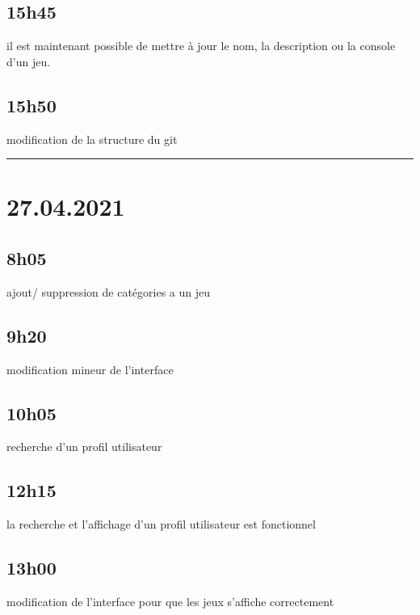 \documentclass[a4paper,12pt,french]{sphinxmanual}
\begin{document}
\subsection{15h45}
\label{\detokenize{logbook:h45}}
\sphinxAtStartPar
il est maintenant possible de mettre à jour le nom, la description ou la console d’un jeu.


\subsection{15h50}
\label{\detokenize{logbook:id33}}
\sphinxAtStartPar
modification de la structure du git


\bigskip\hrule\bigskip



\section{27.04.2021}
\label{\detokenize{logbook:id34}}

\subsection{8h05}
\label{\detokenize{logbook:id35}}
\sphinxAtStartPar
ajout/ suppression de catégories a un jeu


\subsection{9h20}
\label{\detokenize{logbook:id36}}
\sphinxAtStartPar
modification mineur de l’interface


\subsection{10h05}
\label{\detokenize{logbook:id37}}
\sphinxAtStartPar
recherche d’un profil utilisateur


\subsection{12h15}
\label{\detokenize{logbook:h15}}
\sphinxAtStartPar
la recherche et l’affichage d’un profil utilisateur est fonctionnel


\subsection{13h00}
\label{\detokenize{logbook:id38}}
\sphinxAtStartPar
modification de l’interface pour que les jeux s’affiche correctement
\end{document}

